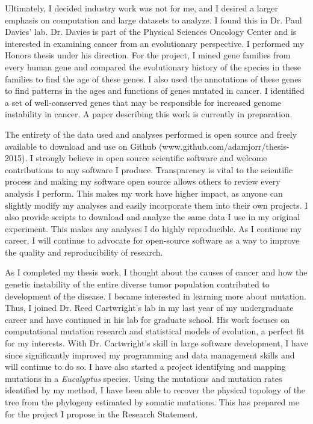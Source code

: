 \documentclass[12pt]{article}
\begin{document}
Ultimately, I decided industry work was not for me, and I desired a larger emphasis on computation and large datasets to analyze. I found this in Dr. Paul Davies' lab. Dr. Davies
is part of the Physical Sciences Oncology Center
and is interested in examining cancer from an evolutionary perspective.
I performed my Honors thesis under his direction. For the project, I mined gene families from every human gene and compared the evolutionary history of the species in these families to find the age of these genes. I also used the annotations of these genes to find patterns in the ages and functions of genes mutated in cancer. I identified a set of well-conserved genes that may be responsible for increased genome instability in cancer. A paper describing this work is currently in preparation.

The entirety of the data used and analyses performed is open source and freely available to download and use on Github (www.github.com/adamjorr/thesis-2015). I strongly believe in open source scientific software and welcome contributions to any software I produce. Transparency is vital to the scientific process and making my software open source allows others to review every analysis I perform. This makes my work have higher impact, as anyone can slightly modify my analyses and easily incorporate them into their own projects. I also provide scripts to download and analyze the same data I use in my original experiment. This makes any analyses I do highly reproducible. As I continue my career, I will continue to advocate for open-source software as a way to improve the quality and reproducibility of research.

As I completed my thesis work, I thought about the causes of cancer and how the genetic instability of the entire diverse tumor population contributed to development of the disease. I became interested in learning more about mutation. Thus, I joined Dr. Reed Cartwright's lab in my last year of my undergraduate career and have continued in his lab for graduate school. His work focuses on computational mutation research and statistical models of evolution, a perfect fit for my interests. With Dr. Cartwright's skill in large software development, I have since significantly improved my programming and data management skills and will continue to do so. I have also started a project identifying and mapping mutations in a \textit{Eucalyptus} species. Using the mutations and mutation rates identified by my method, %
I have been able to recover the physical topology of the tree from the phylogeny estimated by somatic mutations. This has prepared me for the project I propose in the Research Statement.
\end{document}
